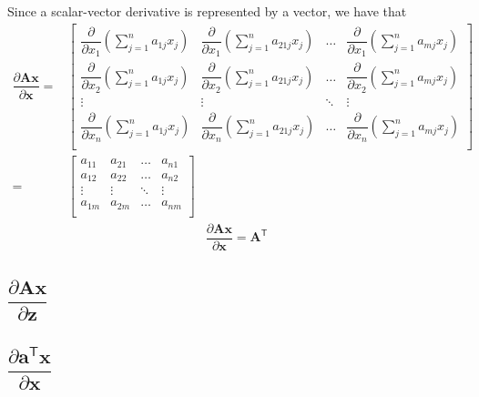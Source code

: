 \documentclass{article}
\newcommand{\trans}{\mathsf{T}}
\begin{document}
Since a scalar-vector derivative is represented by a vector, we have that
\begin{align}
    \dfrac{\partial \mathbf{A} \mathbf{x}}{\partial \mathbf{x}} = & \begin{bmatrix}
        \dfrac{\partial}{\partial x_1} \left( \sum_{j = 1}^n a_{1j}x_j \right) & 
        \dfrac{\partial}{\partial x_1} \left( \sum_{j = 1}^n a_{21j}x_j \right) & 
        \dots & 
        \dfrac{\partial}{\partial x_1} \left( \sum_{j = 1}^n a_{mj}x_j \right) \\
        \dfrac{\partial}{\partial x_2} \left( \sum_{j = 1}^n a_{1j}x_j \right) & 
        \dfrac{\partial}{\partial x_2} \left( \sum_{j = 1}^n a_{21j}x_j \right) & 
        \dots & 
        \dfrac{\partial}{\partial x_2} \left( \sum_{j = 1}^n a_{mj}x_j \right) \\
        \vdots & \vdots & \ddots & \vdots \\
        \dfrac{\partial}{\partial x_n} \left( \sum_{j = 1}^n a_{1j}x_j \right) & 
        \dfrac{\partial}{\partial x_n} \left( \sum_{j = 1}^n a_{21j}x_j \right) & 
        \dots & 
        \dfrac{\partial}{\partial x_n} \left( \sum_{j = 1}^n a_{mj}x_j \right) \\
    \end{bmatrix}  \\
    = & \begin{bmatrix}
        a_{11} & a_{21} & \dots & a_{n1} \\
        a_{12} & a_{22} & \dots & a_{n2} \\
        \vdots & \vdots & \ddots & \vdots \\
        a_{1m} & a_{2m} & \dots & a_{nm} \\
    \end{bmatrix}
\end{align}
\begin{align}
    \boxed{\dfrac{\partial \mathbf{A} \mathbf{x}}{\partial \mathbf{x}} = \mathbf{A}^\trans}
\end{align}

\subsection{\(\dfrac{\partial \mathbf{A}  \mathbf{x}}{\partial \mathbf{z}}\)}

\subsection{\(\dfrac{\partial \mathbf{a}^\trans  \mathbf{x}}{\partial \mathbf{x}}\)}
\end{document}
